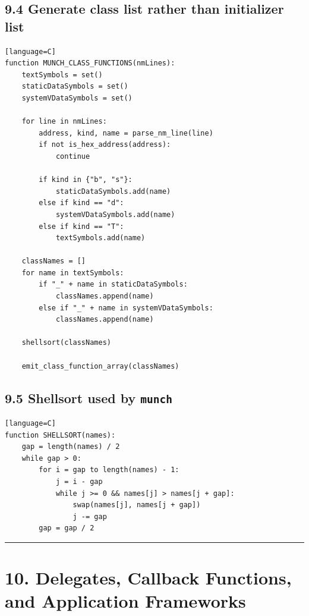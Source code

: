\documentclass[11pt]{article}
\begin{document}
\subsection{9.4 Generate class list rather than initializer
list}\label{generate-class-list-rather-than-initializer-list}

\begin{verbatim}[language=C]
function MUNCH_CLASS_FUNCTIONS(nmLines):
    textSymbols = set()
    staticDataSymbols = set()
    systemVDataSymbols = set()

    for line in nmLines:
        address, kind, name = parse_nm_line(line)
        if not is_hex_address(address):
            continue

        if kind in {"b", "s"}:
            staticDataSymbols.add(name)
        else if kind == "d":
            systemVDataSymbols.add(name)
        else if kind == "T":
            textSymbols.add(name)

    classNames = []
    for name in textSymbols:
        if "_" + name in staticDataSymbols:
            classNames.append(name)
        else if "_" + name in systemVDataSymbols:
            classNames.append(name)

    shellsort(classNames)

    emit_class_function_array(classNames)
\end{verbatim}

\subsection{\texorpdfstring{9.5 Shellsort used by
\texttt{munch}}{9.5 Shellsort used by munch}}\label{shellsort-used-by-munch}

\begin{verbatim}[language=C]
function SHELLSORT(names):
    gap = length(names) / 2
    while gap > 0:
        for i = gap to length(names) - 1:
            j = i - gap
            while j >= 0 && names[j] > names[j + gap]:
                swap(names[j], names[j + gap])
                j -= gap
        gap = gap / 2
\end{verbatim}

\begin{center}\rule{0.5\linewidth}{0.5pt}\end{center}

\section{10. Delegates, Callback Functions, and Application
Frameworks}\label{delegates-callback-functions-and-application-frameworks}
\end{document}
